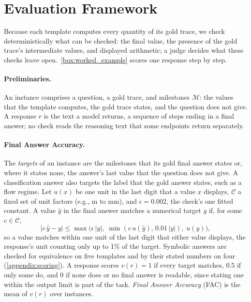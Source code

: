 \section{Evaluation Framework}
\label{sec:evaluation}

Because each template computes every quantity of its gold trace, we check deterministically what can
be checked: the final value, the presence of the gold trace's intermediate values, and displayed
arithmetic; a judge decides what these checks leave open.~\autoref{box:worked_example} scores one response step by step.

\paragraph{Preliminaries.} An instance comprises a question, a gold trace, and milestones
$\mathcal{M}$: the values that the template computes, the gold trace states, and the question does
not give.
A response $r$ is the text a model returns, a sequence of steps ending in a final answer; no check
reads the reasoning text that some endpoints return separately.

\paragraph{Final Answer Accuracy.} The \emph{targets} of an instance are the milestones that its
gold final answer states or, where it states none, the answer's last value that the question does
not give.
A classification answer also targets the label that the gold answer states, such as a flow regime.
Let $u(x)$ be one unit in the last digit that a value $x$ displays, $\mathcal{C}$ a fixed set of
unit factors (e.g., m to mm), and $\epsilon = 0.002$, the check's one fitted constant.
A value $\hat{y}$ in the final answer matches a numerical target $y$ if, for some
$c \in \mathcal{C}$,
\begin{equation}
    |c\,\hat{y} - y| \le \max\bigl(\epsilon\,|y|,\; \min(c\,u(\hat{y}),\, 0.01\,|y|),\; u(y)\bigr),
    \label{eq:match}
\end{equation}
so a value matches within one unit of the last digit that either value displays, the response's
unit counting only up to 1\% of the target.
Symbolic answers are checked for equivalence on five templates and by their stated numbers on four
(\autoref{appendix:scoring}).
A response scores $v(r) = 1$ if every target matches, $0.5$ if only some do, and $0$ if none does or
no final answer is readable, since stating one within the output limit is part of the task.
\emph{Final Answer Accuracy} (FAC) is the mean of $v(r)$ over instances.

